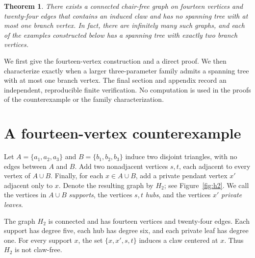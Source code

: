 \documentclass[11pt]{article}
\newtheorem{theorem}{Theorem}
\theoremstyle{remark}
\begin{document}
\begin{theorem}\label{thm:main}
There exists a connected chair-free graph on fourteen vertices and twenty-four edges that contains an induced claw and has no spanning tree with at most one branch vertex. In fact, there are infinitely many such graphs, and each of the examples constructed below has a spanning tree with exactly two branch vertices.
\end{theorem}

We first give the fourteen-vertex construction and a direct proof. We then characterize exactly when a larger three-parameter family admits a spanning tree with at most one branch vertex. The final section and appendix record an independent, reproducible finite verification. No computation is used in the proofs of the counterexample or the family characterization.

\section{A fourteen-vertex counterexample}

Let $A=\{a_1,a_2,a_3\}$ and $B=\{b_1,b_2,b_3\}$ induce two disjoint triangles, with no edges between $A$ and $B$. Add two nonadjacent vertices $s,t$, each adjacent to every vertex of $A\cup B$. Finally, for each $x\in A\cup B$, add a private pendant vertex $x'$ adjacent only to $x$. Denote the resulting graph by $H_2$; see Figure~\ref{fig:h2}. We call the vertices in $A\cup B$ \emph{supports}, the vertices $s,t$ \emph{hubs}, and the vertices $x'$ \emph{private leaves}.

The graph $H_2$ is connected and has fourteen vertices and twenty-four edges. Each support has degree five, each hub has degree six, and each private leaf has degree one. For every support $x$, the set $\{x,x',s,t\}$ induces a claw centered at $x$. Thus $H_2$ is not claw-free.
\end{document}
